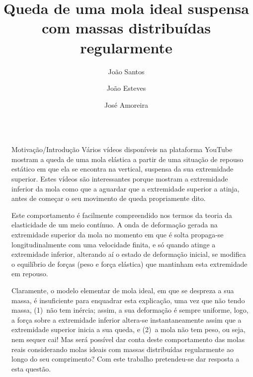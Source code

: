 \documentclass[final]{beamer}
\title{Queda de uma mola ideal suspensa com massas distribuídas regularmente}
\author{João Santos \inst{2} \and João Esteves \inst{2} \and José Amoreira \inst{1,2,3}}
\institute[]{\inst{1} Laboratório de Instrumentação e Física Experimental de Partículas \and \inst{2}Universidade da Beira Interior \samelineand \inst{3} Centro de Matemática e Aplicações (CMAUBI)}
\newlength{\sepwidth}
\newlength{\colwidth}
\newcommand{\separatorcolumn}{\begin{column}{\sepwidth}\end{column}}
\begin{document}
\begin{frame}[t,fragile]
\begin{columns}[t]
\separatorcolumn
\begin{column}{\colwidth}


\begin{exampleblock}{Motivação/Introdução}
  Vários vídeos disponíveis na plataforma YouTube \cite{YouTube,YouTub,YouTube2} mostram a queda de uma mola
  elástica a partir de uma situação de repouso estático em que ela se encontra
  na vertical, suspensa da sua extremidade superior. Estes vídeos são
  interessantes porque mostram a extremidade inferior da mola como que a aguardar
  que a extremidade superior a atinja, antes de começar o seu movimento de queda
  propriamente dito. 
	
  Este comportamento é facilmente compreendido nos termos da teoria da elasticidade de um meio
  contínuo. A onda de deformação gerada na extremidade superior da mola no momento em que é
  solta propaga-se longitudinalmente com uma velocidade finita, e só quando
  atinge a extremidade inferior, alterando aí o estado de deformação inicial, se
  modifica o equilíbrio de forças (peso e força elástica) que mantinham esta
  extremidade em repouso.
	
  Claramente, o modelo elementar de mola ideal, em que se despreza a sua massa,
  é insuficiente para enquadrar esta explicação, uma vez que não tendo massa,
  (1)~não tem inércia; assim, a sua deformação é sempre uniforme, logo, a força sobre a extremidade
  inferior altera-se instantaneamente assim que a extremidade superior inicia a
  sua queda, e (2)~a mola não tem peso, ou seja, nem sequer cai!
  Mas será possível dar conta deste comportamento das molas reais considerando
  molas ideais com massas distribuídas regularmente ao longo do seu
  comprimento? Com este trabalho pretendeu-se dar resposta a esta questão.
\end{exampleblock}



\end{column}
\end{columns}
\end{frame}
\end{document}
